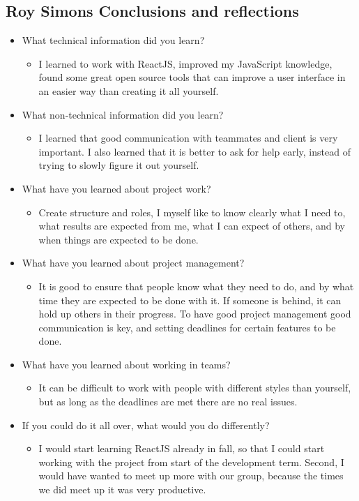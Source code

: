 \documentclass[draftclsnofoot,10pt,onecolumn]{IEEEtran}
\begin{document}
\subsection{Roy Simons Conclusions and reflections}
\begin{itemize}
    \item What technical information did you learn?
    \begin{itemize}
        \item I learned to work with ReactJS, improved my JavaScript knowledge, found some great open source tools that can improve a user interface in an easier way than creating it all yourself.
    \end{itemize}
    \item What non-technical information did you learn?
    \begin{itemize}
        \item I learned that good communication with teammates and client is very important. I also learned that it is better to ask for help early, instead of trying to slowly figure it out yourself.
    \end{itemize}
    \item What have you learned about project work?
    \begin{itemize}
        \item Create structure and roles, I myself like to know clearly what I need to, what results are expected from me, what I can expect of others, and by when things are expected to be done.
    \end{itemize}
    \item What have you learned about project management?
    \begin{itemize}
        \item It is good to ensure that people know what they need to do, and by what time they are expected to be done with it. If someone is behind, it can hold up others in their progress. To have good project management good communication is key, and setting deadlines for certain features to be done.
    \end{itemize}
    \item What have you learned about working in teams?
    \begin{itemize}
        \item It can be difficult to work with people with different styles than yourself, but as long as the deadlines are met there are no real issues.
    \end{itemize}
    \item If you could do it all over, what would you do differently?
    \begin{itemize}
        \item I would start learning ReactJS already in fall, so that I could start working with the project from start of the development term. Second, I would have wanted to meet up more with our group, because the times we did meet up it was very productive.
    \end{itemize}
\end{itemize}
\end{document}
